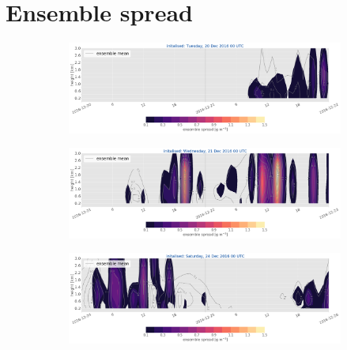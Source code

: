 
\section{Ensemble spread}%
\label{app:ens_spread}

\begin{figure}[h!]
	\centering
	\begin{subfigure}[t]{\textwidth}		\includegraphics[trim={0.cm 5.3cm 0cm 0cm},clip,width=\textwidth]{./fig_ensemble_spread/20161220}
		\caption{}\label{fig:ens_spread20}
	\end{subfigure}
	\begin{subfigure}[t]{\textwidth}		\includegraphics[trim={0.cm 5.3cm 0cm 0cm},clip,width=\textwidth]{./fig_ensemble_spread/20161221}
		\caption{}\label{fig:ens_spread21}
	\end{subfigure}
	\begin{subfigure}[t]{\textwidth}		\includegraphics[trim={15.cm 0cm 15cm 21cm},clip,width=\textwidth]{./fig_ensemble_spread/20161224}
	\end{subfigure}
\end{figure}
